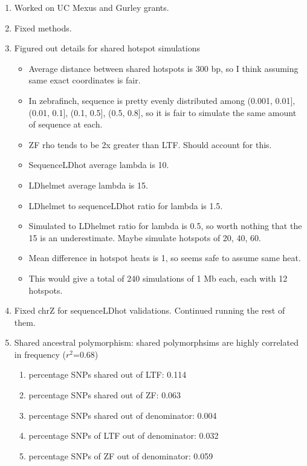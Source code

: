 \documentclass[idxtotoc,hyperref,openany,oneside]{labbook} %
\begin{document}
\begin{enumerate}
\item Worked on UC Mexus and Gurley grants.
\item Fixed methods.
\item Figured out details for shared hotspot simulations
\begin{itemize}
\item Average distance between shared hotspots is 300 bp, so I think assuming same exact coordinates is fair.
\item In zebrafinch, sequence is pretty evenly distributed among (0.001, 0.01], (0.01, 0.1], (0.1, 0.5], (0.5, 0.8], so it is fair to simulate the same amount of sequence at each.
\item ZF rho tends to be 2x greater than LTF. Should account for this.
\item SequenceLDhot average lambda is 10.
\item LDhelmet average lambda is 15.
\item LDhelmet to sequenceLDhot ratio for lambda is 1.5.
\item Simulated to LDhelmet ratio for lambda is 0.5, so worth nothing that the 15 is an underestimate. Maybe simulate hotspots of 20, 40, 60.
\item Mean difference in hotspot heats is 1, so seems safe to assume same heat.
\item This would give a total of 240 simulations of 1 Mb each, each with 12 hotspots.
\end{itemize}
\item Fixed chrZ for sequenceLDhot validations. Continued running the rest of them.
\item Shared ancestral polymorphism: shared polymorphsims are highly correlated in frequency ($r^2$=0.68)
\begin{enumerate}
\item percentage SNPs shared out of LTF: 0.114
\item percentage SNPs shared out of ZF: 0.063
\item percentage SNPs shared out of denominator: 0.004
\item percentage SNPs of LTF out of denominator: 0.032
\item percentage SNPs of ZF out of denominator: 0.059
\end{enumerate}
\end{enumerate}
\end{document}
